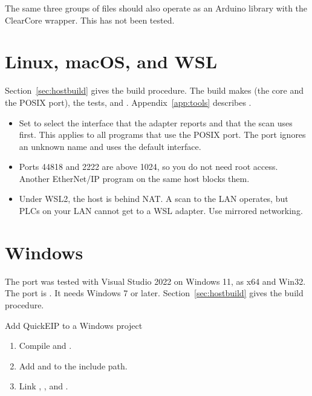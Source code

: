 The same three groups of files should also operate as an Arduino library with
the ClearCore wrapper. This has not been tested.

\section{Linux, macOS, and WSL}\label{sec:posix}

Section~\ref{sec:hostbuild} gives the build procedure. The build makes
 (the core and the POSIX port), the tests, and
. Appendix~\ref{app:tools} describes .

\begin{itemize}
  \item Set  to select the interface that the adapter
        reports and that the scan uses first. This applies to all programs that
        use the POSIX port. The port ignores an unknown name and uses the
        default interface.
  \item Ports 44818 and 2222 are above 1024, so you do not need root access.
        Another EtherNet/IP program on the same host blocks them.
  \item Under WSL2, the host is behind NAT. A scan to the LAN operates, but
        PLCs on your LAN cannot get to a WSL adapter. Use mirrored networking.
\end{itemize}

\section{Windows}\label{sec:windows}

The port was tested with Visual Studio 2022 on Windows 11, as x64 and Win32.
The port is . It needs Windows 7 or
later. Section~\ref{sec:hostbuild} gives the build procedure.

\begin{procedure}{Add QuickEIP to a Windows project}
\begin{enumerate}
  \item Compile  and .
  \item Add  and  to the include path.
  \item Link , , and .
\end{enumerate}
\end{procedure}

